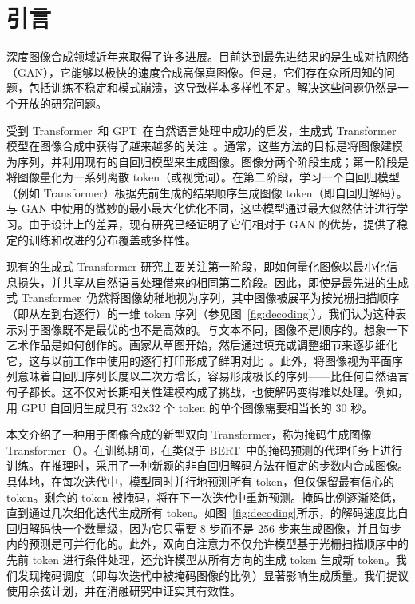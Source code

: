 \section{引言}
\label{sec:intro}



深度图像合成领域近年来取得了许多进展。目前达到最先进结果的是生成对抗网络（GAN），它能够以极快的速度合成高保真图像。但是，它们存在众所周知的问题，包括训练不稳定和模式崩溃，这导致样本多样性不足。解决这些问题仍然是一个开放的研究问题。

受到 Transformer~\cite{Vaswani17attention}和 GPT~\cite{gpt3}在自然语言处理中成功的启发，生成式 Transformer 模型在图像合成中获得了越来越多的关注~\cite{chen2020imagegpt,Esser21vqgan,Razavi19vqvae2}。通常，这些方法的目标是将图像建模为序列，并利用现有的自回归模型来生成图像。图像分两个阶段生成；第一阶段是将图像量化为一系列离散 token（或视觉词）。在第二阶段，学习一个自回归模型（例如 Transformer）根据先前生成的结果顺序生成图像 token（即自回归解码）。与 GAN 中使用的微妙的最小最大化优化不同，这些模型通过最大似然估计进行学习。由于设计上的差异，现有研究已经证明了它们相对于 GAN 的优势，提供了稳定的训练和改进的分布覆盖或多样性。

现有的生成式 Transformer 研究主要关注第一阶段，即如何量化图像以最小化信息损失，并共享从自然语言处理借来的相同第二阶段。因此，即使是最先进的生成式 Transformer~\cite{Esser21vqgan,Ramesh21dalle}仍然将图像幼稚地视为序列，其中图像被展平为按光栅扫描顺序（即从左到右逐行）的一维 token 序列（参见图~\ref{fig:decoding}）。我们认为这种表示对于图像既不是最优的也不是高效的。与文本不同，图像不是顺序的。想象一下艺术作品是如何创作的。画家从草图开始，然后通过填充或调整细节来逐步细化它，这与以前工作中使用的逐行打印形成了鲜明对比~\cite{chen2020imagegpt,Esser21vqgan}。此外，将图像视为平面序列意味着自回归序列长度以二次方增长，容易形成极长的序列——比任何自然语言句子都长。这不仅对长期相关性建模构成了挑战，也使解码变得难以处理。例如，用 GPU 自回归生成具有 32x32 个 token 的单个图像需要相当长的 30 秒。

本文介绍了一种用于图像合成的新型双向 Transformer，称为掩码生成图像 Transformer（\model）。在训练期间，\model 在类似于 BERT~\cite{Devlin19bert}中的掩码预测的代理任务上进行训练。在推理时，\model 采用了一种新颖的非自回归解码方法在恒定的步数内合成图像。具体地，在每次迭代中，模型同时并行地预测所有 token，但仅保留最有信心的 token。剩余的 token 被掩码，将在下一次迭代中重新预测。掩码比例逐渐降低，直到通过几次细化迭代生成所有 token。如图~\ref{fig:decoding}所示，\model 的解码速度比自回归解码快一个数量级，因为它只需要 8 步而不是 256 步来生成图像，并且每步内的预测是可并行化的。此外，双向自注意力不仅允许模型基于光栅扫描顺序中的先前 token 进行条件处理，还允许模型从所有方向的生成 token 生成新 token。我们发现掩码调度（即每次迭代中被掩码图像的比例）显著影响生成质量。我们提议使用余弦计划，并在消融研究中证实其有效性。


